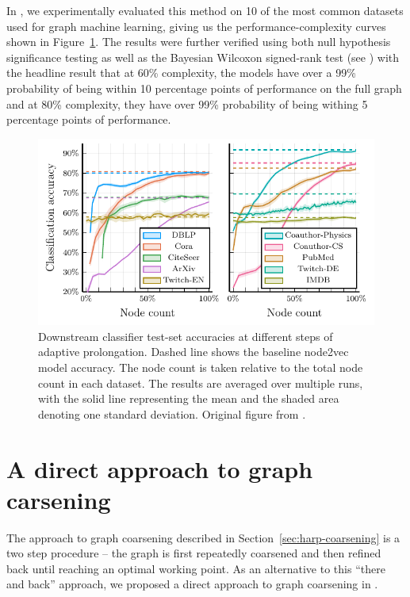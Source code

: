 In \cite{dedic_balancing_2024}, we experimentally evaluated this method on 10 of the most common datasets used for graph machine learning, giving us the performance-complexity curves shown in Figure~\ref{fig:adaptive-coarsening}. The results were further verified using both null hypothesis significance testing as well as the Bayesian Wilcoxon signed-rank test (see \cite{benavoli_bayesian_2014}) with the headline result that at 60\% complexity, the models have over a 99\% probability of being within 10 percentage points of performance on the full graph and at 80\% complexity, they have over 99\% probability of being withing 5 percentage points of performance.

\begin{figure}
	\includegraphics[width=0.8\linewidth]{images/adaptive-coarsening/adaptive-coarsening.pdf}
	\caption{Downstream classifier test-set accuracies at different steps of adaptive prolongation. Dashed line shows the baseline node2vec model accuracy. The node count is taken relative to the total node count in each dataset. The results are averaged over multiple runs, with the solid line representing the mean and the shaded area denoting one standard deviation. Original figure from \cite{dedic_balancing_2024}.}
	\label{fig:adaptive-coarsening}
\end{figure}

\section{A direct approach to graph carsening}
\label{sec:direct-coarsening}

The approach to graph coarsening described in Section~\ref{sec:harp-coarsening} is a two step procedure -- the graph is first repeatedly coarsened and then refined back until reaching an optimal working point. As an alternative to this \enquote{there and back} approach, we proposed a direct approach to graph coarsening in \cite{prochazka_scalable_2022}.

